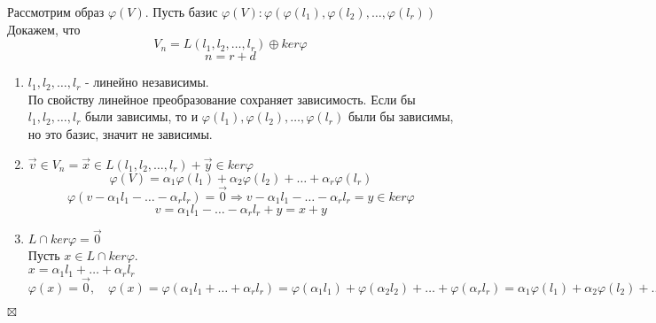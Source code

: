 \documentclass[a4paper, 12pt]{report}
\newenvironment{Proof}
{\par\noindent{$\blacklozenge$}}
{\hfill$\scriptstyle\boxtimes$}
\begin{document}
\begin{Proof}
   Рассмотрим образ $\varphi(V)$. Пусть базис $\varphi(V):\varphi(\varphi(l_1),\varphi(l_2),\dots,\varphi(l_r))$\\
   Докажем, что $$V_n=L(l_1,l_2,\dots,l_r) \oplus ker\varphi$$
   $$n=r+d$$
   \begin{enumerate}
       \item $l_1,l_2,\dots,l_r$ - линейно независимы.\\
       По свойству линейное преобразование сохраняет зависимость. Если бы $l_1,l_2,\dots,l_r$ были зависимы, то и $\varphi(l_1),\varphi(l_2),\dots,\varphi(l_r)$ были бы зависимы, но это базис, значит не зависимы.
       \item $\vec v \in V_n = \vec x \in L(l_1,l_2,\dots,l_r) + \vec y \in ker \varphi$\\
       $$\varphi(V) = \alpha_1\varphi(l_1)+\alpha_2\varphi(l_2)+\dots+\alpha_r\varphi(l_r)$$
       $$\varphi(v-\alpha_1 l_1-\dots-\alpha_r l_r)=\vec 0 \Rightarrow v-\alpha_1 l_1-\dots-\alpha_r l_r = y \in ker \varphi$$
       $$v = \alpha_1 l_1-\dots-\alpha_r l_r + y = x + y$$
       \item $L \cap ker \varphi = \vec 0$\\
       Пусть $x \in L \cap ker \varphi$.\\
       $x = \alpha_1 l_1+\dots+\alpha_r l_r$\\
       $\varphi(x) = \vec 0, \quad \varphi(x) = \varphi(\alpha_1 l_1+\dots+\alpha_r l_r) = \varphi(\alpha_1 l_1)+\varphi(\alpha_2 l_2)+\dots+\varphi(\alpha_r l_r)=\alpha_1\varphi(l_1)+\alpha_2\varphi(l_2)+\dots+\alpha_r\varphi(l_r) = \vec 0 \Rightarrow \alpha_1=\alpha_2=\dots=\alpha_r=0 \Rightarrow x=\vec 0$
   \end{enumerate}
\end{Proof}
\end{document}

